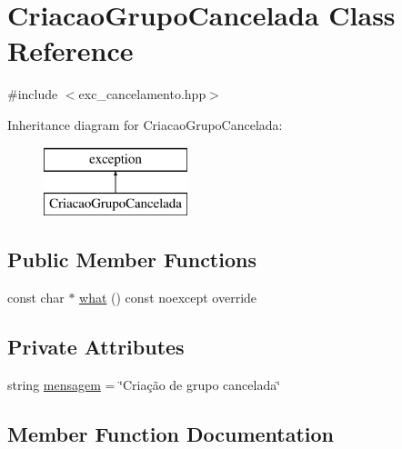 \hypertarget{classCriacaoGrupoCancelada}{}\section{Criacao\+Grupo\+Cancelada Class Reference}
\label{classCriacaoGrupoCancelada}


{\ttfamily \#include $<$exc\+\_\+cancelamento.\+hpp$>$}

Inheritance diagram for Criacao\+Grupo\+Cancelada\+:\begin{figure}[H]
\begin{center}
\leavevmode
\includegraphics[height=2.000000cm]{classCriacaoGrupoCancelada}
\end{center}
\end{figure}
\subsection*{Public Member Functions}
\begin{DoxyCompactItemize}
\item 
const char $\ast$ \hyperlink{classCriacaoGrupoCancelada_a8e4b402896878ae2f154008d2e5eb136}{what} () const noexcept override
\end{DoxyCompactItemize}
\subsection*{Private Attributes}
\begin{DoxyCompactItemize}
\item 
string \hyperlink{classCriacaoGrupoCancelada_a4077c2d32782e91f124566a7085b4acf}{mensagem} = \char`\"{}Criação de grupo cancelada\char`\"{}
\end{DoxyCompactItemize}


\subsection{Member Function Documentation}
\mbox{\label{classCriacaoGrupoCancelada_a8e4b402896878ae2f154008d2e5eb136}} 
